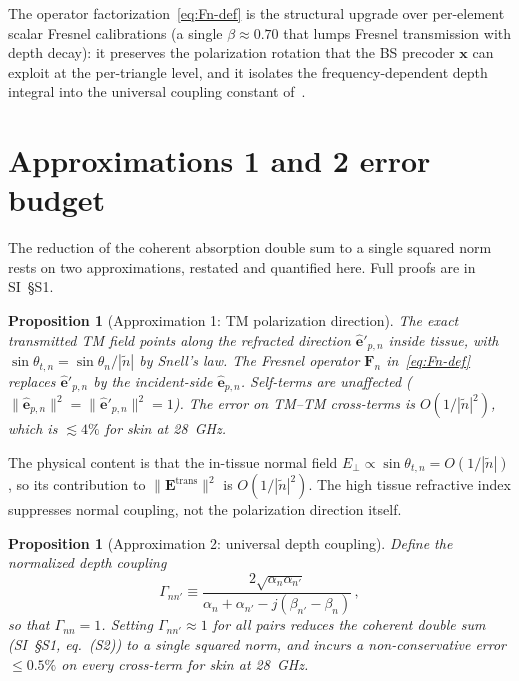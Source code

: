 \documentclass[journal,twocolumn,10pt]{IEEEtran}
\theoremstyle{plain}
\newtheorem{proposition}[theorem]{Proposition}
\theoremstyle{definition}
\theoremstyle{remark}
\newcommand{\EE}{\mathbf{E}}
\newcommand{\Fn}{\mathbf{F}_n}
\newcommand{\ntilde}{\tilde{n}}
\begin{document}
The operator factorization~\eqref{eq:Fn-def} is the structural
upgrade over per-element scalar Fresnel calibrations (a single
$\beta\approx 0.70$ that lumps Fresnel transmission with depth
decay): it preserves the polarization rotation that the BS
precoder $\bm{x}$ can exploit at the per-triangle level, and it
isolates the frequency-dependent depth integral into the universal
coupling constant of~.

\section{Approximations 1 and 2 error budget}\label{app:approxs}

The reduction of the coherent absorption double sum to a single
squared norm rests on two approximations, restated and quantified
here. Full proofs are in SI~\S{}S1.

\begin{proposition}[Approximation 1: TM polarization direction]
\label{prop:approx1-app}
The exact transmitted TM field points along the refracted direction
$\hat{\bm{e}}'_{p,n}$ inside tissue, with
$\sin\theta_{t,n} = \sin\theta_n / |\ntilde|$ by Snell's law. The
Fresnel operator $\Fn$ in~\eqref{eq:Fn-def} replaces
$\hat{\bm{e}}'_{p,n}$ by the incident-side $\hat{\bm{e}}_{p,n}$.
Self-terms are unaffected
($\|\hat{\bm{e}}_{p,n}\|^2 = \|\hat{\bm{e}}'_{p,n}\|^2 = 1$).
The error on TM--TM cross-terms is $O(1/|\ntilde|^2)$, which is
$\lesssim 4\%$ for skin at 28~GHz.
\end{proposition}

The physical content is that the in-tissue normal field
$E_\perp \propto \sin\theta_{t,n} = O(1/|\ntilde|)$, so its
contribution to $\|\EE^{\mathrm{trans}}\|^2$ is $O(1/|\ntilde|^2)$.
The high tissue refractive index suppresses normal coupling, not
the polarization direction itself.

\begin{proposition}[Approximation 2: universal depth coupling]
\label{prop:approx2-app}
Define the normalized depth coupling
\begin{equation}\label{eq:Gamma-app}
  \Gamma_{nn'} \equiv
    \frac{2\sqrt{\alpha_n\alpha_{n'}}}
         {\alpha_n + \alpha_{n'} - j(\beta_{n'} - \beta_n)}\,,
\end{equation}
so that $\Gamma_{nn}=1$. Setting
$\Gamma_{nn'} \approx 1$ for all pairs reduces the coherent double
sum (SI~\S{}S1, eq.~(S2)) to a single squared norm,
and incurs a non-conservative error $\leq 0.5\%$ on every
cross-term for skin at 28~GHz.
\end{proposition}
\end{document}
